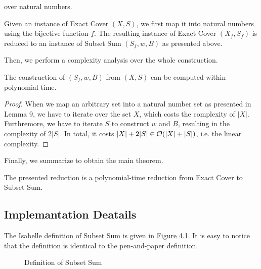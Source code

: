 over natural numbers. 
\begin{definition}
    Given an instance of Exact Cover $(X, S)$, 
    we first map it into natural numbers using the bijective function $f$. 
    The resulting instance of Exact Cover $(X_f, S_f)$ is reduced to an instance of Subset Sum $(S_f, w, B)$ as presented above.
\end{definition}
Then, we perform a complexity analysis over the whole construction.
\begin{lemma}
    The construction of $(S_f, w, B)$ from $(X, S)$ can be computed within polynomial time. 
\end{lemma}
\begin{proof}
    When we map an arbitrary set into a natural number set as presented in Lemma 9, we have to iterate over the set $X$, which costs the complexity of $|X|$. 
Furthremore, we have to iterate $S$ to construct $w$ and $B$, resulting in the complexity of $2|S|$. In total, it costs $|X| + 2|S| \in\mathcal{O}({|X| + |S|})$, 
i.e. the linear complexity. 
\end{proof}
Finally, we summarize to obtain the main theorem.
\begin{theorem}
    The presented reduction is a polynomial-time reduction from Exact Cover to Subset Sum.
\end{theorem}

\subsection{Implemantation Deatails}
The Isabelle definition of Subset Sum is given in \hyperref[fig:4.1]{Figure 4.1}. 
It is easy to notice that the definition is identical to the pen-and-paper definition.
\begin{figure}[!h]
    \caption{Definition of Subset Sum}
    \label{fig:4.1}
\end{figure}
